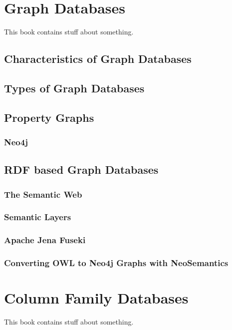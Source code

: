 \chapter{Graph Databases}
\label{chap:nosql:graphdatabases}
This book contains stuff about something.

\section{Characteristics of Graph Databases}
\section{Types of Graph Databases}
\section{Property Graphs}
\subsection{Neo4j}
\section{RDF based Graph Databases}
\subsection{The Semantic Web}
\subsection{Semantic Layers}
\subsection{Apache Jena Fuseki}
\subsection{Converting OWL to Neo4j Graphs with NeoSemantics}

\chapter{Column Family Databases}
\label{chap:nosql:columnfamilydatabases}
This book contains stuff about something.

